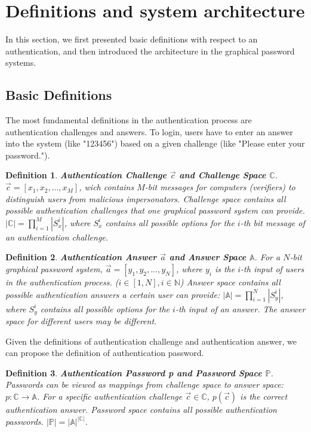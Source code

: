 \documentclass{article}
\newtheorem{definition}{Definition}
\begin{document}
  \section{Definitions and system architecture}
  \label{sec:preliminaries}
  In this section, we first presented basic definitions with respect to an authentication, and then introduced the 
  architecture in the graphical password systems.
  \subsection{Basic Definitions}
  The most fundamental definitions in the authentication process are authentication challenges and answers. To 
  login, users have to enter an answer into the system (like "123456") based on a given challenge (like "Please 
  enter your password.").
  \begin{definition}
    \textbf{Authentication Challenge $\vec c$ and Challenge Space $\mathbb{C}$}. $\vec c = [x_1, x_2,...,x_M]$, 
    wich contains $M$-bit messages for computers (verifiers) to distinguish users from malicious impersonators. 
    Challenge space contains all possible authentication challenges that one graphical password system can 
    provide. $|\mathbb{C}| = \prod\limits_{i=1}^{M}|S_x^i|$, where $S_x^i$ contains all possible options for 
    the $i$-th bit message of an authentication challenge.
  \end{definition}
  \begin{definition}
    \textbf{Authentication Answer $\vec a$ and Answer Space $\mathbb{A}$}. For a $N$-bit graphical password system, $\vec a = [y_1, y_2,...,y_N]$, 
    where $y_i$ is the $i$-th input of users in the authentication process. ($i \in [1, N], i \in \mathbb{N}$) 
    Answer space contains all possible authentication answers a certain user can provide: 
    $|\mathbb{A}| = \prod\limits_{i=1}^{N}|S_y^i|$, where $S_y^i$ contains all possible options for the $i$-th 
    input of an answer. The answer space for different users may be different.
  \end{definition}
  Given the definitions of authentication challenge and authentication answer, we can propose the 
  definition of authentication password.
  \begin{definition}
    \textbf{Authentication Password p and Password Space $\mathbb{P}$}. Passwords can be viewed as mappings from challenge space to answer space: 
    $p:\mathbb{C}\rightarrow\mathbb{A}$. For a specific authentication challenge $\vec c \in \mathbb{C}$, $p(\vec c)$ 
    is the correct authentication answer. Password space contains all possible authentication passwords. $|\mathbb{P}| 
    = |\mathbb{A}|^{|\mathbb{C}|}$.
  \end{definition}
  
\end{document}
